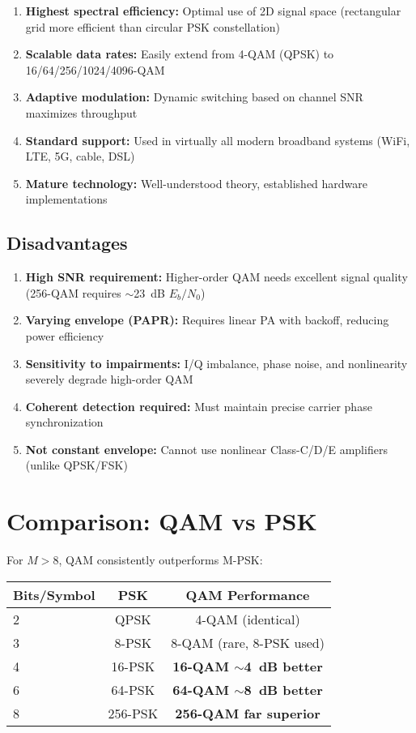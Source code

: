 \begin{enumerate}
\item \textbf{Highest spectral efficiency:} Optimal use of 2D signal space (rectangular grid more efficient than circular PSK constellation)
\item \textbf{Scalable data rates:} Easily extend from 4-QAM (QPSK) to 16/64/256/1024/4096-QAM
\item \textbf{Adaptive modulation:} Dynamic switching based on channel SNR maximizes throughput
\item \textbf{Standard support:} Used in virtually all modern broadband systems (WiFi, LTE, 5G, cable, DSL)
\item \textbf{Mature technology:} Well-understood theory, established hardware implementations
\end{enumerate}

\subsection*{Disadvantages}

\begin{enumerate}
\item \textbf{High SNR requirement:} Higher-order QAM needs excellent signal quality (256-QAM requires $\sim$23~dB $E_b/N_0$)
\item \textbf{Varying envelope (PAPR):} Requires linear PA with backoff, reducing power efficiency
\item \textbf{Sensitivity to impairments:} I/Q imbalance, phase noise, and nonlinearity severely degrade high-order QAM
\item \textbf{Coherent detection required:} Must maintain precise carrier phase synchronization
\item \textbf{Not constant envelope:} Cannot use nonlinear Class-C/D/E amplifiers (unlike QPSK/FSK)
\end{enumerate}

\section{Comparison: QAM vs PSK}

For $M > 8$, QAM consistently outperforms M-PSK:

\begin{center}
\begin{tabular}{@{}lcc@{}}
\toprule
Bits/Symbol & PSK & QAM Performance \\
\midrule
2 & QPSK & 4-QAM (identical) \\
3 & 8-PSK & 8-QAM (rare, 8-PSK used) \\
4 & 16-PSK & \textbf{16-QAM $\sim$4~dB better} \\
6 & 64-PSK & \textbf{64-QAM $\sim$8~dB better} \\
8 & 256-PSK & \textbf{256-QAM far superior} \\
\bottomrule
\end{tabular}
\end{center}

